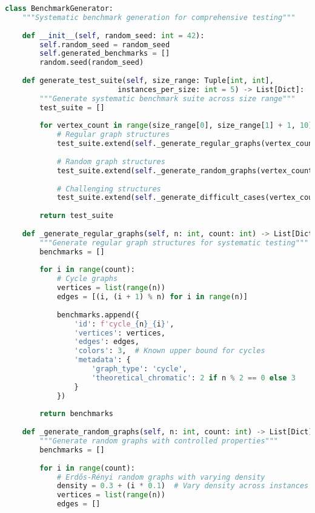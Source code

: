 \begin{lstlisting}[language=Python, caption=Systematic Benchmark Generation]
class BenchmarkGenerator:
    """Systematic benchmark generation for comprehensive testing"""
    
    def __init__(self, random_seed: int = 42):
        self.random_seed = random_seed
        self.generated_benchmarks = []
        random.seed(random_seed)
    
    def generate_test_suite(self, size_range: Tuple[int, int], 
                          instances_per_size: int = 5) -> List[Dict]:
        """Generate systematic benchmark suite across size range"""
        test_suite = []
        
        for vertex_count in range(size_range[0], size_range[1] + 1, 10):
            # Regular graph structures
            test_suite.extend(self._generate_regular_graphs(vertex_count, instances_per_size))
            
            # Random graph structures  
            test_suite.extend(self._generate_random_graphs(vertex_count, instances_per_size))
            
            # Challenging structures
            test_suite.extend(self._generate_difficult_cases(vertex_count))
        
        return test_suite
    
    def _generate_regular_graphs(self, n: int, count: int) -> List[Dict]:
        """Generate regular graph structures for systematic testing"""
        benchmarks = []
        
        for i in range(count):
            # Cycle graphs
            vertices = list(range(n))
            edges = [(i, (i + 1) % n) for i in range(n)]
            
            benchmarks.append({
                'id': f'cycle_{n}_{i}',
                'vertices': vertices,
                'edges': edges,
                'colors': 3,  # Known upper bound for cycles
                'metadata': {
                    'graph_type': 'cycle',
                    'theoretical_chromatic': 2 if n % 2 == 0 else 3
                }
            })
        
        return benchmarks
    
    def _generate_random_graphs(self, n: int, count: int) -> List[Dict]:
        """Generate random graphs with controlled properties"""
        benchmarks = []
        
        for i in range(count):
            # Erdős-Rényi random graphs with varying density
            density = 0.3 + (i * 0.1)  # Vary density across instances
            vertices = list(range(n))
            edges = []
            

\end{lstlisting}
